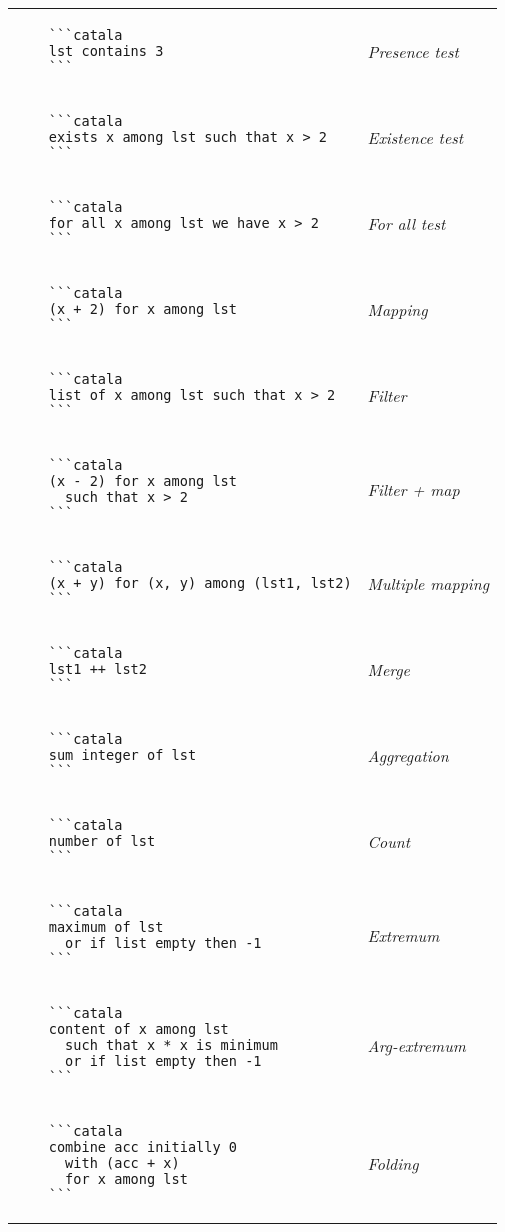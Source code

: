 \documentclass{article}
\makeatletter
\newenvironment{catala}{%
  \VerbatimEnvironment
  \let\FV@ListVSpace\relax
  \begin{verbatim}}%
 {\end{verbatim}}
\makeatother
\begin{document}
\begin{multicols}{3}
\begin{tabular}{@{}p{\cola}>{\slshape}p{\colb}@{}}
  \begin{catala}
    ```catala
    lst contains 3
    ```
  \end{catala}
  & Presence test
  \\
  \begin{catala}
    ```catala
    exists x among lst such that x > 2
    ```
  \end{catala}
  & Existence test
  \\
  \begin{catala}
    ```catala
    for all x among lst we have x > 2
    ```
  \end{catala}
  & For all test
  \\
  \begin{catala}
    ```catala
    (x + 2) for x among lst
    ```
  \end{catala}
  & Mapping
  \\
  \begin{catala}
    ```catala
    list of x among lst such that x > 2
    ```
  \end{catala}
  & Filter
  \\
  \begin{catala}
    ```catala
    (x - 2) for x among lst
      such that x > 2
    ```
  \end{catala}
  & Filter + map
  \\
  \begin{catala}
    ```catala
    (x + y) for (x, y) among (lst1, lst2)
    ```
  \end{catala}
  & Multiple mapping
  \\
  \begin{catala}
    ```catala
    lst1 ++ lst2
    ```
  \end{catala}
  & Merge
  \\
  \begin{catala}
    ```catala
    sum integer of lst
    ```
  \end{catala}
  & Aggregation
  \\
  \begin{catala}
    ```catala
    number of lst
    ```
  \end{catala}
  & Count
  \\
  \begin{catala}
    ```catala
    maximum of lst
      or if list empty then -1
    ```
  \end{catala}
  & Extremum
  \\
  \begin{catala}
    ```catala
    content of x among lst
      such that x * x is minimum
      or if list empty then -1
    ```
  \end{catala}
  & Arg-extremum
  \\
  \begin{catala}
    ```catala
    combine acc initially 0
      with (acc + x)
      for x among lst
    ```
  \end{catala}
  & Folding
  \\
\end{tabular}

\end{multicols}
\end{document}
